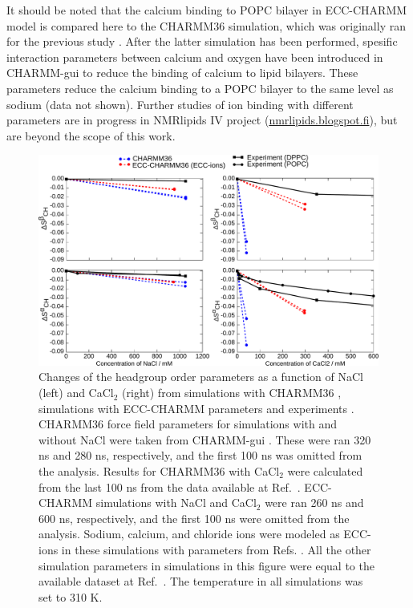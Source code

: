 \documentclass[journal=jpcbfk]{achemso}
\begin{document}
It should be noted that the calcium binding to POPC bilayer in ECC-CHARMM model
is compared here to the CHARMM36 simulation, which was originally ran for
the previous study \cite{catte16,charmmPOPC450mMCaClfiles}.
After the latter simulation has been performed, spesific interaction parameters
between calcium and oxygen \cite{kim16} have been introduced in CHARMM-gui
to reduce the binding of calcium to lipid bilayers. These parameters
reduce the calcium binding to a POPC bilayer to the same level as sodium (data not shown).
Further studies of ion binding with different parameters are in progress
in NMRlipids IV project (\url{nmrlipids.blogspot.fi}), but are beyond the scope of this work. 


\begin{figure}[!h]
  \centering
  \includegraphics[width=16.0cm]{../Fig/OP.pdf}
  \caption{\label{scaledCHARMM}
    Changes of the headgroup order parameters as a function of NaCl (left) and CaCl$_2$ (right)
    from simulations with CHARMM36 \cite{klauda10}, simulations with ECC-CHARMM parameters and experiments \cite{akutsu81,altenbach84}. 
    CHARMM36 force field parameters for simulations with and without NaCl were taken from CHARMM-gui \cite{lee15}.
    These were ran 320 ns and 280 ns, respectively, and the first 100 ns was omitted from the analysis.
    Results for CHARMM36 with CaCl$_2$ were calculated from the last 100 ns from the data available at Ref.~.
    ECC-CHARMM simulations with NaCl and CaCl$_2$ were ran 260 ns and 600 ns, respectively, and the first 100 ns were omitted from the analysis.
    Sodium, calcium, and chloride ions were modeled as ECC-ions in these simulations with parameters from Refs. .
    All the other simulation parameters in simulations in this figure were equal to the available dataset at Ref.~.
    The temperature in all simulations was set to 310 K.
  }
\end{figure}
\end{document}
